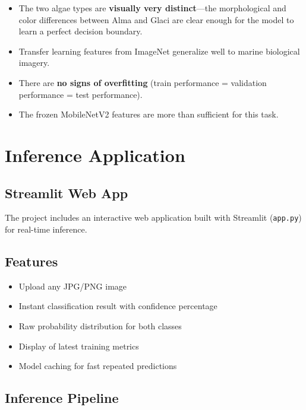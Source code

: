 \documentclass[12pt,a4paper]{article}
\begin{document}
\begin{itemize}
    \item The two algae types are \textbf{visually very distinct}---the morphological and color differences between Alma and Glaci are clear enough for the model to learn a perfect decision boundary.
    \item Transfer learning features from ImageNet generalize well to marine biological imagery.
    \item There are \textbf{no signs of overfitting} (train performance = validation performance = test performance).
    \item The frozen MobileNetV2 features are more than sufficient for this task.
\end{itemize}

\section{Inference Application}

\subsection{Streamlit Web App}

The project includes an interactive web application built with Streamlit (\texttt{app.py}) for real-time inference.

\subsection{Features}

\begin{itemize}
    \item Upload any JPG/PNG image
    \item Instant classification result with confidence percentage
    \item Raw probability distribution for both classes
    \item Display of latest training metrics
    \item Model caching for fast repeated predictions
\end{itemize}

\subsection{Inference Pipeline}
\end{document}
